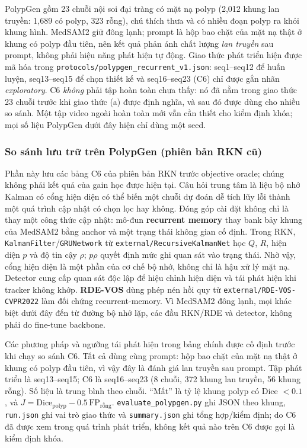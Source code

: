 \documentclass[a4paper,12pt]{report}
\begin{document}
PolypGen gồm 23 chuỗi nội soi đại tràng có mặt nạ polyp (2,012 khung lan truyền: 1,689 có polyp, 323 rỗng), chú thích thưa và có nhiều đoạn polyp ra khỏi khung hình. MedSAM2 giữ đông lạnh; prompt là hộp bao chặt của mặt nạ thật ở khung có polyp đầu tiên, nên kết quả phản ánh chất lượng \emph{lan truyền} sau prompt, không phải hiệu năng phát hiện tự động. Giao thức phát triển hiện được mã hóa trong \texttt{protocols/polypgen\_recurrent\_v1.json}: seq1--seq12 để huấn luyện, seq13--seq15 để chọn thiết kế và seq16--seq23 (C6) chỉ được gắn nhãn \emph{exploratory}. C6 \emph{không} phải tập hoàn toàn chưa thấy: nó đã nằm trong giao thức 23 chuỗi trước khi giao thức (a) được định nghĩa, và sau đó được dùng cho nhiều so sánh. Một tập video ngoài hoàn toàn mới vẫn cần thiết cho kiểm định khóa; mọi số liệu PolypGen dưới đây hiện chỉ dùng một seed.

\subsubsection{So sánh lưu trữ trên PolypGen (phiên bản RKN cũ)}

Phần này lưu các bảng C6 của phiên bản RKN trước objective oracle; chúng không phải kết quả của gain học được hiện tại. Câu hỏi trung tâm là liệu bộ nhớ Kalman có cổng hiện diện có thể biến một chuỗi dự đoán dễ tích lũy lỗi thành một quá trình cập nhật có chọn lọc hay không. Đóng góp cài đặt không chỉ là thay một công thức cập nhật: mô-đun \textbf{recurrent memory} thay bank bảy khung của MedSAM2 bằng anchor và một trạng thái không gian cố định. Trong RKN, \texttt{KalmanFilter}/\texttt{GRUNetwork} từ \texttt{external/RecursiveKalmanNet} học $Q$, $R$, hiện diện $p$ và độ tin cậy $\rho$; $p\rho$ quyết định mức ghi quan sát vào trạng thái. Nhờ vậy, cổng hiện diện là một phần của cơ chế bộ nhớ, không chỉ là hậu xử lý mặt nạ. Detector cung cấp quan sát độc lập để hiệu chỉnh hiện diện và tái phát hiện khi tracker không khớp. \textbf{RDE-VOS} dùng phép nén hồi quy từ \texttt{external/RDE-VOS-CVPR2022} làm đối chứng recurrent-memory. Vì MedSAM2 đông lạnh, mọi khác biệt dưới đây đến từ đường bộ nhớ lặp, các đầu RKN/RDE và detector, không phải do fine-tune backbone.

Các phương pháp và ngưỡng tái phát hiện trong bảng chính được cố định trước khi chạy so sánh C6. Tất cả dùng cùng prompt: hộp bao chặt của mặt nạ thật ở khung có polyp đầu tiên, vì vậy đây là đánh giá lan truyền sau prompt. Tập phát triển là seq13--seq15; C6 là seq16--seq23 (8 chuỗi, 372 khung lan truyền, 56 khung rỗng). Số liệu là trung bình theo chuỗi. ``Mất'' là tỷ lệ khung polyp có Dice $<0.1$, và $J=\mathrm{Dice}_{\text{polyp}}-0.5\,\mathrm{FP}_{\text{rỗng}}$. \texttt{evaluate\_polypgen.py} ghi JSON theo khung, \texttt{run.json} ghi vai trò giao thức và \texttt{summary.json} ghi tổng hợp/kiểm định; do C6 đã được xem trong quá trình phát triển, không kết quả nào trên C6 được gọi là kiểm định khóa.
\end{document}
